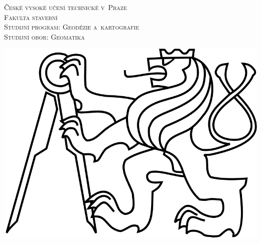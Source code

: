 \documentclass[a4paper,12pt,oneside]{book}
\begin{document}
\begin{titlepage}
\center %
 

\textsc{\LARGE České vysoké učení technické v~Praze}\\[0.5cm] %
\textsc{\Large Fakulta stavební}\\[0.5cm] %
\textsc{\large Studijní program: Geodézie a~kartografie}\\[0.5cm] %
\textsc{\large Studijní obor: Geomatika}\\[0.5cm] %


\vspace{50pt}

\includegraphics[scale=1.2]{images/cvut_logo.png}  %


\vspace{40pt}


\end{titlepage}
\end{document}
